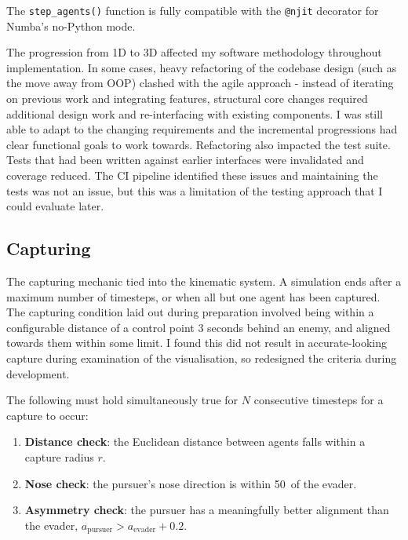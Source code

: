 The \texttt{step\_agents()} function is fully compatible with the \texttt{@njit} decorator for Numba's no-Python mode.

The progression from 1D to 3D affected my software methodology throughout implementation. In some cases, heavy refactoring of the codebase design (such as the move away from OOP) clashed with the agile approach - instead of iterating on previous work and integrating features, structural core changes required additional design work and re-interfacing with existing components. I was still able to adapt to the changing requirements and the incremental progressions had clear functional goals to work towards.
Refactoring also impacted the test suite. Tests that had been written against earlier interfaces were invalidated and coverage reduced. The CI pipeline identified these issues and maintaining the tests was not an issue, but this was a limitation of the testing approach that I could evaluate later. 


\subsection{Capturing}
\label{sec:3.2.4}

The capturing mechanic tied into the kinematic system. A simulation ends after a maximum number of timesteps, or when all but one agent has been captured. The capturing condition laid out during preparation involved being within a configurable distance of a control point 3 seconds behind an enemy, and aligned towards them within some limit. I found this did not result in accurate-looking capture during examination of the visualisation, so redesigned the criteria during development.

The following must hold simultaneously true for $N$ consecutive timesteps for a capture to occur:

\begin{enumerate}[nosep]
    \item \textbf{Distance check}: the Euclidean distance between agents falls within a capture radius $r$.
    \item \textbf{Nose check}: the pursuer's nose direction is within 50\textdegree~of the evader.
    \item \textbf{Asymmetry check}: the pursuer has a meaningfully better alignment than the evader, $a_\text{pursuer} > a_\text{evader} + 0.2$.
\end{enumerate}

